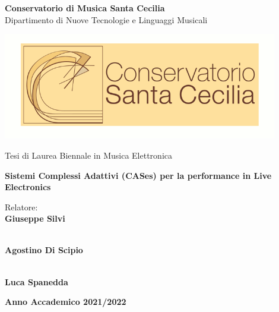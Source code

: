\begin{center}
{\LARGE \textbf{Conservatorio di Musica Santa Cecilia}} \\
\vspace{0.2cm}
{\Large {Dipartimento di Nuove Tecnologie e Linguaggi
Musicali}} \\ 
\vspace{1cm}

\includegraphics[width=12cm]{figures/unito-logo.png} \\
\vspace{0.8cm}

{\Large {Tesi di Laurea Biennale in Musica Elettronica}} \\
\vspace{1cm}

{\LARGE \textbf{Sistemi Complessi Adattivi (CASes) per la performance in Live Electronics}} \\ 
\vspace{1cm}

\end{center}

\begin{multicols}{2}
\noindent \large{Relatore:} \\
\large{\textbf{Giuseppe Silvi}} \\
\vspace{0.1cm}

 \\
\large{\textbf{Agostino Di Scipio}} \\
\vspace{0.1cm}

\columnbreak

 \\
\large{\textbf{Luca Spanedda}} \\
\end{multicols}
\vspace{2cm}

\begin{center}
    \large{\textbf{Anno Accademico 2021/2022}}
\end{center}